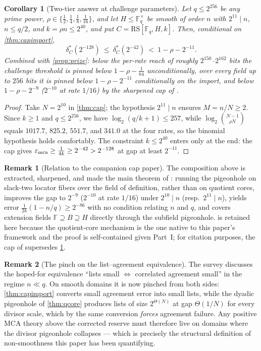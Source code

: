 \documentclass[11pt]{article}
\newtheorem{corollary}[corollary]{Corollary}
\theoremstyle{definition}
\newtheorem{remark}[remark]{Remark}
\newcommand{\F}{\mathbb F}
\newcommand{\eps}{\varepsilon}
\newcommand{\RS}{\mathrm{RS}}
\newcommand{\emca}{\eps_{\rm mca}}
\begin{document}
\begin{corollary}[Two-tier answer at challenge parameters]\label{cor:captiers}
Let $q\le2^{256}$ be any prime power, $\rho\in\{\frac12,\frac14,\frac18,\frac1{16}\}$, and let $H\le\F_q^\times$ be smooth of order $n$ with $2^{11}\mid n$, $n\le q/2$, and $k=\rho n\le2^{40}$, and put $C=\RS[\F_q,H,k]$.  Then, conditional on \cref{thm:capimport},
\[
        \delta^*_C(2^{-128})\ \le\ \delta^*_C(2^{-42})\ <\ 1-\rho-2^{-11}.
\]
Combined with \cref{prop:prize}: below the per-rate reach of roughly $2^{150}$--$2^{162}$ bits the challenge threshold is pinned below $1-\rho-\frac1{64}$ unconditionally, over every field up to $256$ bits it is pinned below $1-\rho-2^{-11}$ conditionally on the import, and below $1-\rho-2^{-9}$ ($2^{-10}$ at rate $1/16$) by the sharpened cap of \cite{UniversalCap}.
\end{corollary}

\begin{proof}
Take $N=2^{10}$ in \cref{thm:cap}; the hypothesis $2^{11}\mid n$ ensures $M=n/N\ge2$.  Since $k\ge1$ and $q\le2^{256}$, we have $\log_2(q/k+1)\le257$, while $\log_2\binom{N-1}{\rho N}$ equals $1017.7$, $825.2$, $551.7$, and $341.0$ at the four rates, so the binomial hypothesis holds comfortably.  The constraint $k\le2^{40}$ enters only at the end: the cap gives $\emca\ge\frac1{4k}\ge2^{-42}>2^{-128}$ at gap at least $2^{-11}$.
\end{proof}

\begin{remark}[Relation to the companion cap paper]\label{rem:capcompanion}
The composition above is extracted, sharpened, and made the main theorem of \cite{UniversalCap}: running the pigeonhole on slack-two locator fibers over the field of definition, rather than on quotient cores, improves the gap to $2^{-9}$ ($2^{-10}$ at rate $1/16$) under $2^{10}\mid n$ (resp.\ $2^{11}\mid n$), yields error $\frac1{2k}(1-n/q)\ge2^{-86}$ with no condition relating $n$ and $q$, and covers extension fields $\F\supseteq B\supseteq H$ directly through the subfield pigeonhole.   is retained here because the quotient-core mechanism is the one native to this paper's framework and the proof is self-contained given Part~I; for citation purposes, the cap of \cite{UniversalCap} supersedes \cref{cor:captiers}.
\end{remark}

\begin{remark}[The pinch on the list--agreement equivalence]\label{rem:pinch}
The survey \cite{ABF26} discusses the hoped-for equivalence ``lists small $\Leftrightarrow$ correlated agreement small'' in the regime $n\ll q$.  On smooth domains it is now pinched from both sides: \cref{thm:capimport} converts small agreement error into small lists, while the dyadic pigeonhole of \cref{thm:qcore} produces lists of size $2^{\Theta(N)}$ at gap $\Theta(1/N)$ for every divisor scale, which by the same conversion \emph{forces} agreement failure.  Any positive MCA theory above the corrected reserve must therefore live on domains where the divisor pigeonhole collapses --- which is precisely the structural definition of non-smoothness this paper has been quantifying.
\end{remark}
\end{document}
